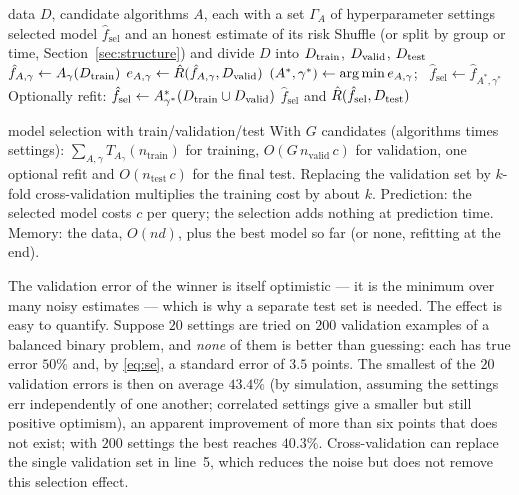 \documentclass[11pt]{article}
\begin{document}
\begin{algorithm}[htbp]\small
\caption{Model selection with a training, a validation and a test set}
\label{alg:selection}
\begin{algorithmic}[1]
\Require data $D$, candidate algorithms $A$, each with a set $\Gamma_A$ of hyperparameter settings
\Ensure selected model $\hat f_{\mathrm{sel}}$ and an honest estimate of its risk
\State Shuffle (or split by group or time, Section~\ref{sec:structure}) and divide $D$ into $D_{\mathrm{train}}$, $D_{\mathrm{valid}}$, $D_{\mathrm{test}}$
  \State $\hat f_{A,\gamma} \gets A_\gamma(D_{\mathrm{train}})$ 
  \State $e_{A,\gamma} \gets \hat R(\hat f_{A,\gamma}, D_{\mathrm{valid}})$ 
\EndFor
\State $(A^*, \gamma^*) \gets \operatorname*{arg\,min} e_{A,\gamma}$; \ $\hat f_{\mathrm{sel}} \gets \hat f_{A^*,\gamma^*}$
\State Optionally refit: $\hat f_{\mathrm{sel}} \gets A^*_{\gamma^*}(D_{\mathrm{train}} \cup D_{\mathrm{valid}})$
\State \Return $\hat f_{\mathrm{sel}}$ and $\hat R(\hat f_{\mathrm{sel}}, D_{\mathrm{test}})$ 
\EndFunction
\end{algorithmic}
\end{algorithm}

\begin{runtime}{model selection with train/validation/test}
With $G$ candidates (algorithms times settings): $\sum_{A,\gamma} T_{A_\gamma}(n_{\mathrm{train}})$ for training,
$O(G\,n_{\mathrm{valid}}\,c)$ for validation, one optional refit and $O(n_{\mathrm{test}}\,c)$ for the final test.
Replacing the validation set by $k$-fold cross-validation multiplies the training cost by about $k$. Prediction: the
selected model costs $c$ per query; the selection adds nothing at prediction time. Memory: the data, $O(nd)$, plus
the best model so far (or none, refitting at the end).
\end{runtime}

The validation error of the winner is itself optimistic --- it is the minimum over many noisy estimates --- which is
why a separate test set is needed. The effect is easy to quantify. Suppose $20$ settings are tried on $200$
validation examples of a balanced binary problem, and \emph{none} of them is better than guessing: each has true error
$50\%$ and, by \eqref{eq:se}, a standard error of $3.5$ points. The smallest of the $20$ validation errors is then on
average $43.4\%$ (by simulation, assuming the settings err independently of one another; correlated settings give a
smaller but still positive optimism), an apparent improvement of more than six points that does not exist; with $200$
settings the best reaches $40.3\%$. Cross-validation can replace the single validation set in line~5, which reduces
the noise but does not remove this selection effect.
\end{document}
